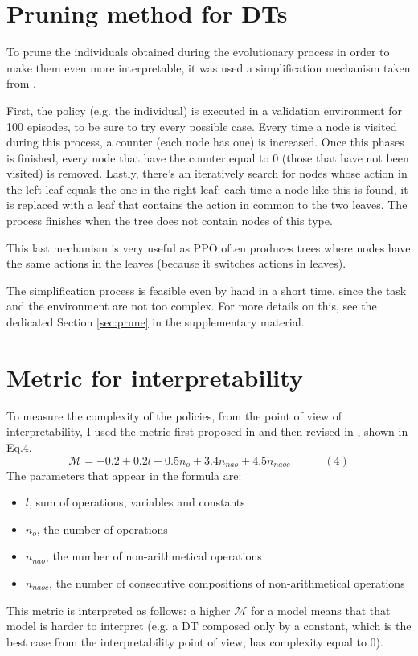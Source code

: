 \section{Pruning method for DTs}
\label{sec:240}
To prune the individuals obtained during the evolutionary process in order to make them even more interpretable, it was used a simplification mechanism taken from \cite{custode}.

First, the policy (e.g. the individual) is executed in a validation environment for 100 episodes, to be sure to try every possible case. Every time a node is visited during this process, a counter (each node has one) is increased. Once this phases is finished, every node that have the counter equal to 0 (those that have not been visited) is removed. Lastly, there's an iteratively search for nodes whose action in the left leaf equals the one in the right leaf: each time a node like this is found, it is replaced with a leaf that contains the action in common to the two leaves. The process finishes when the tree does not contain nodes of this type.

This last mechanism is very useful as PPO often produces trees where nodes have the same actions in the leaves (because it switches actions in leaves).

The simplification process is feasible even by hand in a short time, since the task and the environment are not too complex. For more details on this, see the dedicated Section \ref{sec:prune} in the supplementary material.


\section{Metric for interpretability}
\label{sec:250}
To measure the complexity of the policies, from the point of view of interpretability, I used the metric first proposed in \cite{metric} and then revised in \cite{custode}, shown in Eq.4.
\[\mathcal{M}=-0.2+0.2l+0.5n_o+3.4n_{nao}+4.5n_{naoc}\qquad\quad(4)\]
The parameters that appear in the formula are:
\begin{itemize}
    \item $l$, sum of operations, variables and constants
    \item $n_o$, the number of operations
    \item $n_{nao}$, the number of non-arithmetical operations
    \item $n_{naoc}$, the number of consecutive compositions of non-arithmetical operations
\end{itemize}
This metric is interpreted as follows: a higher $\mathcal{M}$ for a model means that that model is harder to interpret (e.g. a DT composed only by a constant, which is the best case from the interpretability point of view, has complexity equal to 0).
\newpage